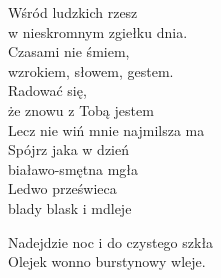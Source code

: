 \begin{text}
    Wśród ludzkich rzesz\\
    w nieskromnym zgiełku dnia.\\
    Czasami nie śmiem,\\
    wzrokiem, słowem, gestem.\\
    Radować się,\\
    że znowu z Tobą jestem\\
    Lecz nie wiń mnie najmilsza ma\\
    Spójrz jaka w dzień\\
    białawo-smętna mgła\\
    Ledwo prześwieca\\
    blady blask i mdleje

    Nadejdzie noc i do czystego szkła\\
    Olejek wonno burstynowy wleje.
\end{text}
\begin{chord}

\end{chord}